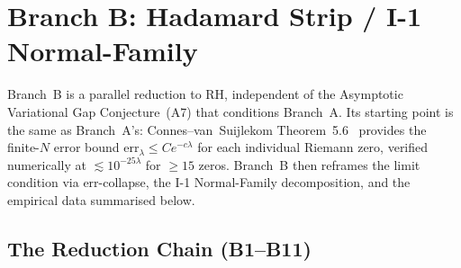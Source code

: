 \documentclass[12pt,a4paper]{article}
\theoremstyle{definition}
\theoremstyle{remark}
\begin{document}
\section{Branch B: Hadamard Strip / I-1 Normal-Family}
\label{sec:branch-b}

Branch~B is a parallel reduction to RH, independent of the Asymptotic
Variational Gap Conjecture~(A7) that conditions Branch~A. Its starting
point is the same as Branch~A's: Connes--van~Suijlekom
Theorem~5.6~\cite{ConnesvS2025} provides the finite-$N$ error bound
$\mathrm{err}_\lambda \leq C e^{-c\lambda}$ for each individual Riemann
zero, verified numerically at $\lesssim 10^{-25\lambda}$ for $\geq 15$
zeros. Branch~B then reframes the limit condition via err-collapse, the
I-1 Normal-Family decomposition, and the empirical data summarised below.


\subsection{The Reduction Chain (B1--B11)}
\label{sec:branch-b-chain}
\end{document}
